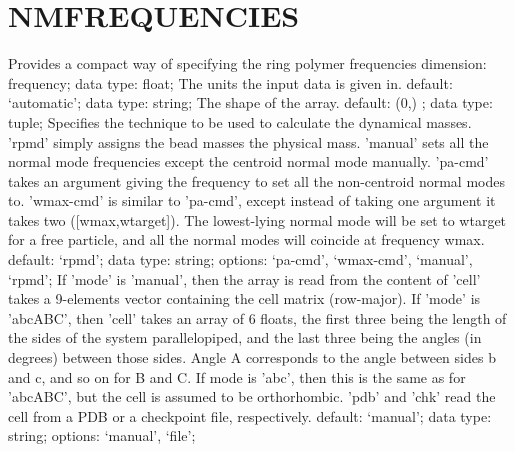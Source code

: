 \section{NMFREQUENCIES}
\label{NMFREQUENCIES}
\begin{ipifield}{}%
{Provides a compact way of specifying the ring polymer frequencies}%
{dimension: frequency; data type: float; }%
{%
{The units the input data is given in.}%
{default: `automatic'; data type: string; }%
%
{The shape of the array.}%
{default:  (0,) ; data type: tuple; }%
%
{Specifies the technique to be used to calculate the dynamical masses.
                                                'rpmd' simply assigns the bead masses the physical mass.
                                                'manual' sets all the normal mode frequencies except the centroid normal mode manually.
                                                'pa-cmd' takes an argument giving the frequency to set all the non-centroid normal modes to.
                                                'wmax-cmd' is similar to 'pa-cmd', except instead of taking one argument it takes two
                                                      ([wmax,wtarget]). The lowest-lying normal mode will be set to wtarget for a
                                                      free particle, and all the normal modes will coincide at frequency wmax. }%
{default: `rpmd'; data type: string; options: `pa-cmd', `wmax-cmd', `manual', `rpmd'; }%
%
{If 'mode' is 'manual', then the array is read from the content of 'cell' takes a 9-elements vector containing the cell matrix (row-major). If 'mode' is 'abcABC', then 'cell' takes an array of 6 floats, the first three being the length of the sides of the system parallelopiped, and the last three being the angles (in degrees) between those sides. Angle A corresponds to the angle between sides b and c, and so on for B and C. If mode is 'abc', then this is the same as for 'abcABC', but the cell is assumed to be orthorhombic. 'pdb' and 'chk' read the cell from a PDB or a checkpoint file, respectively.}%
{default: `manual'; data type: string; options: `manual', `file'; }%
}
\end{ipifield}
